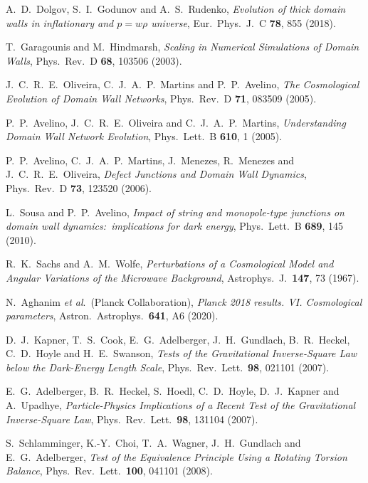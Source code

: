 \documentclass[aps,prd,onecolumn,nofootinbib]{revtex4-2} %
\begin{document}
\begin{thebibliography}{99}
 A.~D.~Dolgov, S.~I.~Godunov and A.~S.~Rudenko, \textit{Evolution of thick domain walls in inflationary and $p = w \rho$ universe}, Eur.~Phys.~J.~C \textbf{78}, 855 (2018). 

 T.~Garagounis and M.~Hindmarsh, \textit{Scaling in Numerical Simulations of Domain Walls}, Phys.~Rev.~D \textbf{68}, 103506 (2003). 

 J.~C.~R.~E.~Oliveira, C.~J.~A.~P.~Martins and P.~P.~Avelino, \textit{The Cosmological Evolution of Domain Wall Networks}, Phys.~Rev.~D \textbf{71}, 083509 (2005). 

 P.~P.~Avelino, J.~C.~R.~E.~Oliveira and C.~J.~A.~P.~Martins, \textit{Understanding Domain Wall Network Evolution}, Phys.~Lett.~B \textbf{610}, 1 (2005). 

 P.~P.~Avelino, C.~J.~A.~P.~Martins, J.~Menezes, R.~Menezes and J.~C.~R.~E.~Oliveira, \textit{Defect Junctions and Domain Wall Dynamics}, Phys.~Rev.~D \textbf{73}, 123520 (2006). 

 L.~Sousa and P.~P.~Avelino, \textit{Impact of string and monopole-type junctions on domain wall dynamics:~implications for dark energy}, Phys.~Lett.~B \textbf{689}, 145 (2010). 


 R.~K.~Sachs and A.~M.~Wolfe, \textit{Perturbations of a Cosmological Model and Angular Variations of the Microwave Background}, Astrophys.~J.~\textbf{147}, 73 (1967). 

 N.~Aghanim \textit{et al}.~(Planck Collaboration), \textit{Planck 2018 results. VI. Cosmological parameters}, Astron.~Astrophys.~\textbf{641}, A6 (2020). 


 D.~J.~Kapner, T.~S.~Cook, E.~G.~Adelberger, J.~H.~Gundlach, B.~R.~Heckel, C.~D.~Hoyle and H.~E.~Swanson, \textit{Tests of the Gravitational Inverse-Square Law below the Dark-Energy Length Scale}, Phys.~Rev.~Lett.~\textbf{98}, 021101 (2007). 

 E.~G.~Adelberger, B.~R.~Heckel, S.~Hoedl, C.~D.~Hoyle, D.~J.~Kapner and A.~Upadhye, \textit{Particle-Physics Implications of a Recent Test of the Gravitational Inverse-Square Law}, Phys.~Rev.~Lett.~\textbf{98}, 131104 (2007). 

 S.~Schlamminger, K.-Y.~Choi, T.~A.~Wagner, J.~H.~Gundlach and E.~G.~Adelberger, \textit{Test of the Equivalence Principle Using a Rotating Torsion Balance}, Phys.~Rev.~Lett.~\textbf{100}, 041101 (2008). 


\end{thebibliography}
\end{document}
